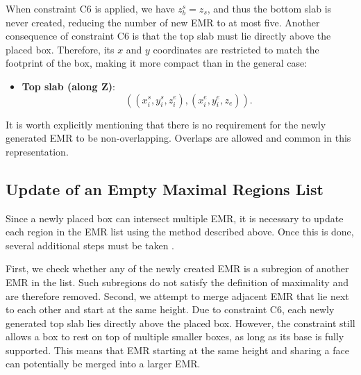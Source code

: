 When constraint C6 is applied, we have $z_b^s = z_s$, and thus the bottom slab is never created, reducing the number of new EMR to at most five.
Another consequence of constraint C6 is that the top slab must lie directly above the placed box. 
Therefore, its $x$ and $y$ coordinates are restricted to match the footprint of the box, making it more compact than in the general case:

\begin{itemize}
    \item \textbf{Top slab (along Z)}:
    \[
    ((x_i^s, y_i^s, z_i^e), (x_i^e, y_i^e, z_e)).
    \]
\end{itemize}

It is worth explicitly mentioning that there is no requirement for the newly generated EMR to be non-overlapping. Overlaps are allowed and common in this representation.

\subsection{Update of an Empty Maximal Regions List}

Since a newly placed box can intersect multiple EMR, it is necessary to update each region in the EMR list using the method described above. 
Once this is done, several additional steps must be taken \cite{goncalves2013}.

First, we check whether any of the newly created EMR is a subregion of another EMR in the list. Such subregions do not satisfy the definition of maximality and are therefore removed.
Second, we attempt to merge adjacent EMR that lie next to each other and start at the same height.
Due to constraint C6, each newly generated top slab lies directly above the placed box. 
However, the constraint still allows a box to rest on top of multiple smaller boxes, as long as its base is fully supported. 
This means that EMR starting at the same height and sharing a face can potentially be merged into a larger EMR.


